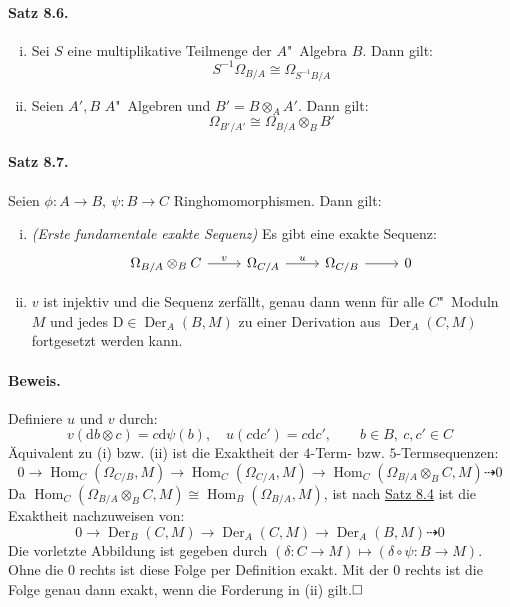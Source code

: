 \documentclass[11pt,b5paper,openany]{memoir}
\def \qed {$\hfill\square$}
\begin{document}
\paragraph{Satz 8.6.}\label{8.6} \begin{enumerate}[(i)]
\item Sei $S$ eine multiplikative Teilmenge der $A$"~Algebra $B$. Dann gilt:
\[S^{-1}\Omega_{B/A}\cong\Omega_{S^{-1}B/A} \]
\item Seien $A',B$ $A$"~Algebren und $B'=B\otimes_AA'$. Dann gilt:
\[\Omega_{B'/A'}\cong\Omega_{B/A}\otimes_BB' \]
\end{enumerate}

\paragraph{Satz 8.7.}\label{8.7} Seien $\phi:A\to B,\ \psi:B\to C$ Ringhomomorphismen. Dann gilt:
\begin{enumerate}[(i)]
\item \textit{(Erste fundamentale exakte Sequenz)} Es gibt eine exakte Sequenz:
\[\begin{tikzcd}
\Omega_{B/A}\otimes_BC \ar[r, "v"] & \Omega_{C/A} \ar[r, "u"] & \Omega_{C/B}\rar & 0
\end{tikzcd} \]
\item $v$ ist injektiv und die Sequenz zerfällt, genau dann wenn für alle $C$"~Moduln $M$ und jedes $\mathrm{D}\in \operatorname{Der}_A(B,M)$ zu einer Derivation aus $\operatorname{Der}_A(C,M)$ fortgesetzt werden kann.
\end{enumerate}

\paragraph{Beweis.} Definiere $u$ und $v$ durch:
\[v(\mathrm{d}b\otimes c)= c\mathrm{d}\psi(b),\quad u(c\mathrm{d}c') = c\mathrm{d}c',\qquad b\in B,\ c,c'\in C \]
Äquivalent zu (i) bzw. (ii) ist die Exaktheit der $4$-Term- bzw. $5$-Termsequenzen:
\[0\longrightarrow \operatorname{Hom}_C(\Omega_{C/B},M)\longrightarrow \operatorname{Hom}_C(\Omega_{C/A},M)\longrightarrow \operatorname{Hom}_C(\Omega_{B/A}\otimes_B C,M)\dashrightarrow 0  \]
Da $\operatorname{Hom}_C(\Omega_{B/A}\otimes_B C,M)\cong\operatorname{Hom}_B(\Omega_{B/A},M)$, ist nach \hyperref[8.4]{Satz 8.4} ist die Exaktheit nachzuweisen von:
\[0\longrightarrow \operatorname{Der}_B(C,M)\longrightarrow \operatorname{Der}_A(C,M)\longrightarrow \operatorname{Der}_A(B,M)\dashrightarrow 0 \]
Die vorletzte Abbildung ist gegeben durch $(\delta:C\to M)\mapsto (\delta\circ\psi: B\to M)$. Ohne die $0$ rechts ist diese Folge per Definition exakt. Mit der $0$ rechts ist die Folge genau dann exakt, wenn die Forderung in (ii) gilt.\qed
\end{document}
